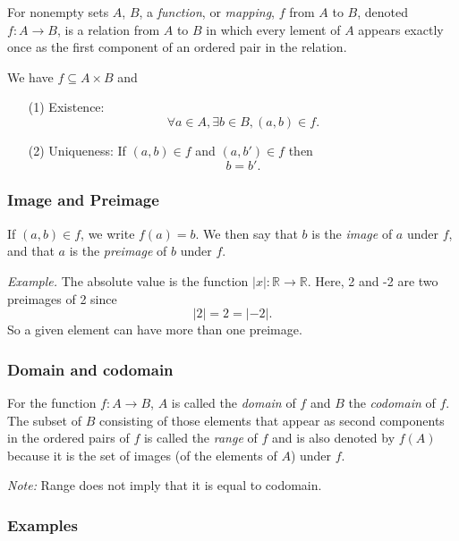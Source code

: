 \documentclass[11pt]{article}
\begin{document}
        For nonempty sets $A$, $B$, a \emph{function}, or \emph{mapping}, $f$ from $A$ to $B$, denoted \(f: A \rightarrow B\), is a relation from $A$ to $B$ in which every lement of $A$ appears exactly once as the first component of an ordered pair in the relation. 

        \vspace{1em}

        We have \(f \subseteq A \times B\) and 
        \begin{enumerate}
            \item[(1)] Existence: \[\forall a \in A, \exists b \in B, (a,b) \in f.\]
            \item[(2)] Uniqueness: If \((a,b) \in f\) and \((a,b') \in f\) then \[b = b'.\]   
        \end{enumerate}

        \subsubsection{Image and Preimage}

        If \((a,b) \in f\), we write \(f(a)=b\). We then say that $b$ is the \emph{image} of $a$ under $f$, and that $a$ is the \emph{preimage} of $b$ under $f$.

        \vspace{1em}

        \emph{Example.} The absolute value is the function \(|x|: \mathbb{R} \rightarrow \mathbb{R}\). Here, 2 and -2 are two preimages of 2 since \[|2| = 2 = |-2|.\] So a given element can have more than one preimage.

        \subsubsection{Domain and codomain}

        For the function \(f: A \rightarrow B\), $A$ is called the \emph{domain} of $f$ and $B$ the \emph{codomain} of $f$. The subset of $B$ consisting of those elements that appear as second components in the ordered pairs of $f$ is called the \emph{range} of $f$ and is also denoted by $f(A)$ because it is the set of images (of the elements of $A$) under $f$.

        \vspace{1em}

        \emph{Note:} Range does not imply that it is equal to codomain.

        \subsubsection{Examples}
\end{document}
